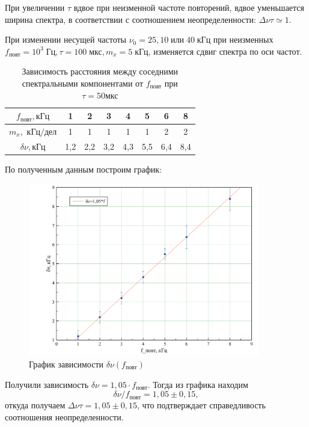 \documentclass[a4paper, 12pt]{article}
\begin{document}
При увеличении $\tau$ вдвое при неизменной частоте повторений, вдвое уменьшается ширина спектра, в соответствии с соотношением неопределенности: $\Delta \nu \tau \simeq 1$.

При изменении несущей частоты  $\nu_0 = 25, 10 \; \text{или} \; 40\; \text{кГц}$ при неизменных $f_\text{повт} = 10^3 \; \text{Гц}, \tau = 100 \; \text{мкс}, m_x = 5 \; \text{кГц}$, изменяется сдвиг спектра по оси частот.

\begin{table}[H]
\centering
\begin{tabular}{|c|c|c|c|c|c|c|c|}
\hline
$f_\text{повт}, \text{кГц}$ & 1    & 2    & 3    & 4    & 5    & 6        & 8    \\ \hline
$m_x, \text{ кГц/дел}$          & 1    & 1    & 1    & 1    & 1    & 2      & 2   \\ \hline
$\delta \nu, \text{кГц}$    & 1,2&	2,2&	3,2&	4,3&	5,5&	6,4&	8,4 \\ \hline
\end{tabular}
\caption{Зависимость расстояния между соседними спектральными компонентами от $f_\text{повт}$ при $\tau = 50 \text{мкс}$ }
\end{table}

По полученным данным построим график:

\begin{figure}[H]
\centering
\includegraphics[width = 0.9\textwidth]{Plot_B}
\caption{График зависимости $\delta \nu (f_\text{повт})$}
\end{figure}

Получили зависимость $ \delta \nu = 1,05\cdot f_{\text{повт}}$. Тогда из графика находим $$\delta \nu/ f_{\text{повт}} = 1,05 \pm 0,15,$$ откуда получаем $\Delta \nu \tau = 1,05 \pm 0,15$, что подтверждает справедливость соотношения неопределенности.
\end{document}
